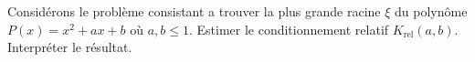 
\begin{exercice}\label{exoSerieDeux0005}

	Considérons le problème consistant a trouver la plus grande racine $\xi$ du polynôme $P(x)=x^2+ax+b$ où $a,b\leq1$. Estimer le conditionnement relatif $K_{\text{rel}}(a,b)$. Interpréter le résultat.

\end{exercice}
